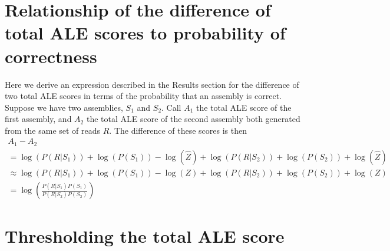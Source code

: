 \documentclass[phd,tocprelim]{cornell}
\begin{document}
\section{Relationship of the difference of total ALE scores to probability of correctness} %
\label{sec:Relationship of the difference of total ALE scores to probability of correctness}

Here we derive an expression described in the Results section for the difference of two total ALE scores in terms of the probability that an assembly is correct.  Suppose we have two assemblies, $S_{1}$ and $S_{2}$.  Call $A_{1}$ the total ALE score of the first assembly, and $A_{2}$ the total ALE score of the second assembly both generated from the same set of reads $R$. The difference of these scores is then
\begin{equation}
    \begin{array}{l}
        A_{1} - A_{2} \\
        = \log\left(P\left(R|S_{1}\right)\right) + \log\left(P\left(S_{1}\right)\right) - \log\left(\hat{Z}\right) + \log\left(P\left(R|S_{2}\right)\right) + \log\left(P\left(S_{2}\right)\right) + \log\left(\hat{Z}\right) \\
        \approx \log\left(P\left(R|S_{1}\right)\right) + \log\left(P\left(S_{1}\right)\right) - \log\left(Z\right) + \log\left(P\left(R|S_{2}\right)\right) + \log\left(P\left(S_{2}\right)\right) + \log\left(Z\right) \\
        = \log\left(\frac{P\left(R|S_{1}\right)P\left(S_{1}\right)}{P\left(R|S_{2}\right)P\left(S_{2}\right)}\right)
    \end{array}
\end{equation}


\section{Thresholding the total ALE score} %
\label{sec:Thresholding the total ALE score}
\end{document}
